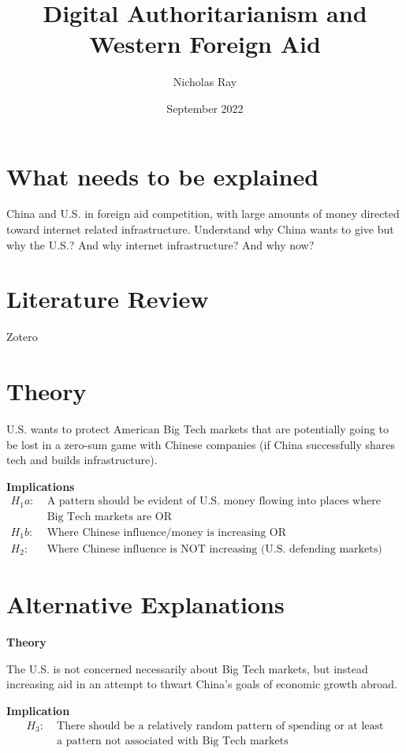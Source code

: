 \documentclass{article}
\title{Digital Authoritarianism and Western Foreign Aid}
\author{Nicholas Ray}
\date{September 2022}
\begin{document}
\maketitle
\section*{What needs to be explained}
China and U.S. in foreign aid competition, with large amounts of money directed toward internet related infrastructure.
Understand why China wants to give but why the U.S.? And why internet infrastructure? And why now?

\section*{Literature Review}
Zotero

\section*{Theory} 
U.S. wants to protect American Big Tech markets that are potentially going to be lost in a zero-sum game with Chinese companies (if China successfully shares tech and builds infrastructure).

\textbf{Implications} 
\begin{align*}
    H_1a:\; & \text{A pattern should be evident of U.S. money flowing into places where either}\\
    & \text{Big Tech markets are OR}\\
    H_1b:\; & \text{Where Chinese influence/money is increasing OR}\\
    H_2:\; & \text{Where Chinese influence is NOT increasing (U.S. defending markets)}
\end{align*}

\section*{Alternative Explanations}
\textbf{Theory}

The U.S. is not concerned necessarily about Big Tech markets, but instead increasing aid in an attempt to thwart China's goals of economic growth abroad.

\textbf{Implication}
\begin{align*}
    H_3:\; & \text{There should be a relatively random pattern of spending or at least}\\
    & \text{a pattern not associated with Big Tech markets}
\end{align*}
\end{document}
